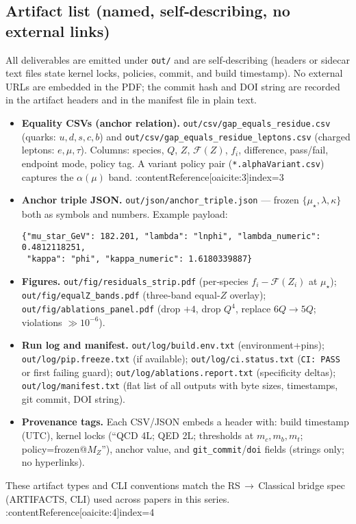 \documentclass[epjc3]{svjour3}
\begin{document}
\subsection{Artifact list (named, self‑describing, no external links)}
\noindent All deliverables are emitted under \texttt{out/} and are self‑describing (headers or sidecar text files state kernel locks, policies, commit, and build timestamp). No external URLs are embedded in the PDF; the commit hash and DOI string are recorded in the artifact headers and in the manifest file in plain text.
\begin{itemize}
  \item \textbf{Equality CSVs (anchor relation).}
        \texttt{out/csv/gap\_equals\_residue.csv} (quarks: $u,d,s,c,b$) and
        \texttt{out/csv/gap\_equals\_residue\_leptons.csv} (charged leptons: $e,\mu,\tau$).
        Columns: species, $Q$, $Z$, $\mathcal F(Z)$, $f_i$, difference, pass/fail, endpoint mode, policy tag. A variant policy pair (\texttt{*.alphaVariant.csv}) captures the $\alpha(\mu)$ band. :contentReference[oaicite:3]{index=3}
  \item \textbf{Anchor triple JSON.}
        \texttt{out/json/anchor\_triple.json} — frozen $\{\mu_\star,\lambda,\kappa\}$ both as symbols and numbers. Example payload:
\begin{verbatim}
{"mu_star_GeV": 182.201, "lambda": "lnphi", "lambda_numeric": 0.4812118251,
 "kappa": "phi", "kappa_numeric": 1.6180339887}
\end{verbatim}
  \item \textbf{Figures.}
        \texttt{out/fig/residuals\_strip.pdf} (per‑species $f_i-\mathcal F(Z_i)$ at $\mu_\star$);
        \texttt{out/fig/equalZ\_bands.pdf} (three‑band equal‑$Z$ overlay);
        \texttt{out/fig/ablations\_panel.pdf} (drop $+4$, drop $Q^4$, replace $6Q\!\to\!5Q$; violations $\gg10^{-6}$).
  \item \textbf{Run log and manifest.}
        \texttt{out/log/build.env.txt} (environment+pins);
        \texttt{out/log/pip.freeze.txt} (if available);
        \texttt{out/log/ci.status.txt} (\texttt{CI: PASS} or first failing guard);
        \texttt{out/log/ablations.report.txt} (specificity deltas);
        \texttt{out/log/manifest.txt} (flat list of all outputs with byte sizes, timestamps, git commit, DOI string).
  \item \textbf{Provenance tags.}
        Each CSV/JSON embeds a header with: build timestamp (UTC), kernel locks (``QCD 4L; QED 2L; thresholds at $m_c,m_b,m_t$; policy=frozen@$M_Z$''), anchor value, and \texttt{git\_commit}/\texttt{doi} fields (strings only; no hyperlinks).
\end{itemize}
These artifact types and CLI conventions match the RS\,$\to$\,Classical bridge spec (\textsf{ARTIFACTS}, \textsf{CLI}) used across papers in this series. :contentReference[oaicite:4]{index=4}
\end{document}
